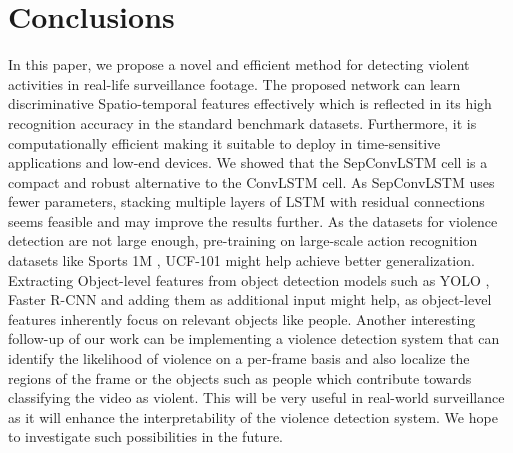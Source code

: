 \documentclass[conference]{IEEEtran}
\begin{document}
\section{Conclusions}
In this paper, we propose a novel and efficient method for detecting violent activities in real-life surveillance footage. The proposed network can learn discriminative Spatio-temporal features effectively which is reflected in its high recognition accuracy in the standard benchmark datasets. Furthermore, it is computationally efficient making it suitable to deploy in time-sensitive applications and low-end devices. We showed that the SepConvLSTM cell is a compact and robust alternative to the ConvLSTM cell. As SepConvLSTM uses fewer parameters, stacking multiple layers of LSTM with residual connections seems feasible and may improve the results further. As the datasets for violence detection are not large enough, pre-training on large-scale action recognition datasets like Sports 1M \cite{karpathy2014large}, UCF-101 \cite{soomro2012ucf101} might help achieve better generalization. Extracting Object-level features from object detection models such as YOLO \cite{yolo}, Faster R-CNN \cite{fasterrcnn} and adding them as additional input might help, as object-level features inherently focus on relevant objects like people. Another interesting follow-up of our work can be implementing a violence detection system that can identify the likelihood of violence on a per-frame basis and also localize the regions of the frame or the objects such as people which contribute towards classifying the video as violent. This will be very useful in real-world surveillance as it will enhance the interpretability of the violence detection system. We hope to investigate such possibilities in the future.

{\small

  }
\end{document}
